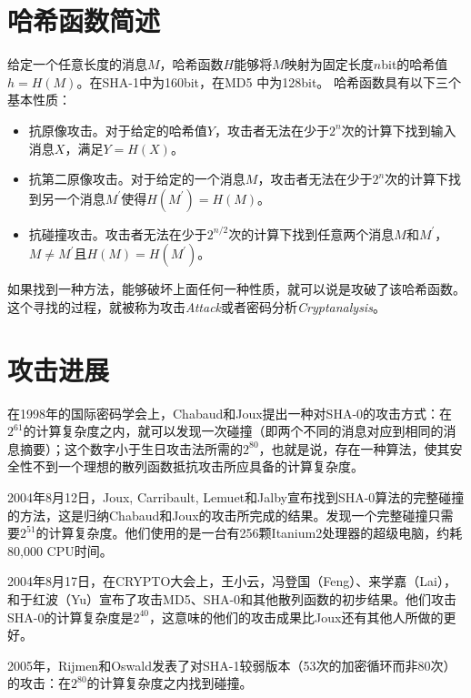 


\section{哈希函数简述}

给定一个任意长度的消息$M$，哈希函数$H$能够将$M$映射为固定长度$n$bit的哈希值$h=H(M)$。在SHA-1中为160bit，在MD5
中为128bit。
哈希函数具有以下三个基本性质\cite{kelsey2005second}：
\begin{itemize}
    \item 抗原像攻击。对于给定的哈希值$Y$，攻击者无法在少于$2^n$次的计算下找到输入消息$X$，满足$Y=H(X)$。
    \item 抗第二原像攻击。对于给定的一个消息$M$，攻击者无法在少于$2^n$次的计算下找到另一个消息$M^\prime$使得$H(M^\prime) = H(M)$。
    \item 抗碰撞攻击。攻击者无法在少于$2^{n/2}$次的计算下找到任意两个消息$M$和$M^\prime$，$M\neq M^\prime$且$H(M)=H(M^\prime)$。
\end{itemize}

如果找到一种方法，能够破坏上面任何一种性质，就可以说是攻破了该哈希函数。
这个寻找的过程，就被称为攻击\textit{Attack}或者密码分析\textit{Cryptanalysis}。

\section{攻击进展}

在1998年的国际密码学会上，Chabaud和Joux提出一种对SHA-0的攻击方式\cite{10.1007/BFb0055720}：在$2^{61}$的计算复杂度之内，就可以发现一次碰撞（即两个不同的消息对应到相同的消息摘要）；这个数字小于生日攻击法所需的$2^{80}$，也就是说，存在一种算法，使其安全性不到一个理想的散列函数抵抗攻击所应具备的计算复杂度。

2004年8月12日，Joux, Carribault, Lemuet和Jalby宣布找到SHA-0算法的完整碰撞的方法，这是归纳Chabaud和Joux的攻击所完成的结果。发现一个完整碰撞只需要$2^{51}$的计算复杂度。他们使用的是一台有256颗Itanium2处理器的超级电脑，约耗80,000 CPU时间。

2004年8月17日，在CRYPTO大会上，王小云，冯登国（Feng）、来学嘉（Lai），和于红波（Yu）宣布了攻击MD5、SHA-0和其他散列函数的初步结果。他们攻击SHA-0的计算复杂度是$2^{40}$，这意味的他们的攻击成果比Joux还有其他人所做的更好。

2005年，Rijmen和Oswald发表了对SHA-1较弱版本（53次的加密循环而非80次）的攻击\cite{cryptoeprint:2005:010}：在$2^{80}$的计算复杂度之内找到碰撞。

